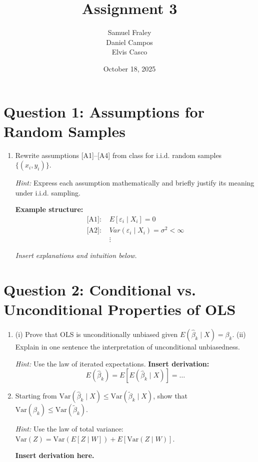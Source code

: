 \documentclass[12pt,a4paper]{article}
\title{Assignment 3}
\author{
  Samuel Fraley \\ 
  Daniel Campos \\ 
  Elvis Casco
}
\date{October 18, 2025}
\begin{document}
\maketitle
\tableofcontents
\newpage

\section*{Question 1: Assumptions for Random Samples}

\begin{enumerate}[label=(\alph*)]
  \item Rewrite assumptions [A1]–[A4] from class for i.i.d. random samples $\{(x_i, y_i)\}$.

  \textit{Hint:} Express each assumption mathematically and briefly justify its meaning under i.i.d. sampling.

  \vspace{1em}
  \textbf{Example structure:}
  \begin{align*}
  \text{[A1]: } & E[\varepsilon_i \mid X_i] = 0 \\
  \text{[A2]: } & Var(\varepsilon_i \mid X_i) = \sigma^2 < \infty \\
  & \vdots
  \end{align*}

  \textit{Insert explanations and intuition below.}
\end{enumerate}

\newpage
\section*{Question 2: Conditional vs. Unconditional Properties of OLS}

\begin{enumerate}[label=(\alph*)]
  \item 
  (i) Prove that OLS is unconditionally unbiased given $E(\hat{\beta}_k \mid X) = \beta_k$.  
  (ii) Explain in one sentence the interpretation of unconditional unbiasedness.

  \textit{Hint:} Use the law of iterated expectations.  
  \textbf{Insert derivation:}
  \[
  E(\hat{\beta}_k) = E[E(\hat{\beta}_k \mid X)] = \dots
  \]

  \vspace{1em}
  \item 
  Starting from $\text{Var}(\hat{\beta}_k \mid X) \le \text{Var}(\tilde{\beta}_k \mid X)$,  
  show that $\text{Var}(\hat{\beta}_k) \le \text{Var}(\tilde{\beta}_k)$.

  \textit{Hint:} Use the law of total variance:  
  $\text{Var}(Z) = \text{Var}(E[Z \mid W]) + E[\text{Var}(Z \mid W)]$.

  \textbf{Insert derivation here.}
\end{enumerate}
\end{document}
